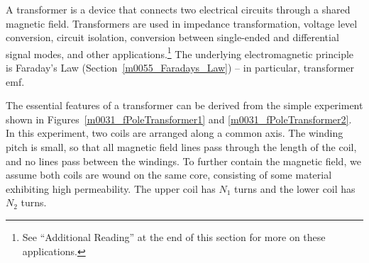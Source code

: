 

\label{m0031_Transformers_Principle_of_Operation} %

A transformer is a device that connects two electrical circuits through a shared magnetic field.  
Transformers are used in impedance transformation, voltage level conversion, circuit isolation, conversion between single-ended and differential signal modes, and other applications.\footnote{See ``Additional Reading'' at the end of this section for more on these applications.}
The underlying electromagnetic principle is Faraday's Law (Section~\ref{m0055_Faradays_Law}) -- in particular, transformer emf.

The essential features of a transformer can be derived from the simple experiment shown in Figures~\ref{m0031_fPoleTransformer1} and \ref{m0031_fPoleTransformer2}.  
In this experiment, two coils are arranged along a common axis.  
The winding pitch is small, so that all magnetic field lines pass through the length of the coil, and no lines pass between the windings.
To further contain the magnetic field, we assume both coils are wound on the same core, consisting of some material exhibiting high permeability. 
The upper coil has $N_1$ turns and the lower coil has $N_2$ turns. 

